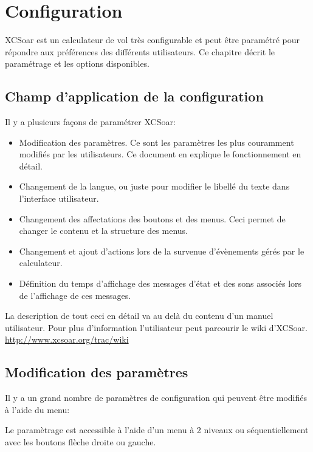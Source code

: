 \chapter{Configuration}\label{cha:configuration}
XCSoar est un calculateur de vol très configurable et peut être paramétré pour répondre aux préférences des différents utilisateurs. Ce chapitre décrit le paramétrage et les options disponibles.

\section{Champ d'application de la configuration}
Il y a plusieurs façons de paramétrer XCSoar:
\begin{itemize}

\item Modification des paramètres. Ce sont les paramètres les plus couramment modifiés par les utilisateurs. Ce document en explique le fonctionnement en détail.
\item Changement de la langue, ou juste pour modifier le libellé du texte dans l'interface utilisateur.
\item Changement des affectations des boutons et des menus. Ceci permet de changer le contenu et la structure des menus.
\item Changement et ajout d'actions lors de la survenue d'évènements gérés par le calculateur.
\item Définition du temps d'affichage des messages d'état et des sons associés lors de l'affichage de ces messages.
\end{itemize}
La description de tout ceci en détail va au delà du contenu d'un manuel utilisateur. Pour plus d'information l'utilisateur peut parcourir le wiki d'XCSoar. \url{http://www.xcsoar.org/trac/wiki}

\section{Modification des paramètres}

Il y a un grand nombre de paramètres de configuration qui peuvent être modifiés à l'aide du menu:
\begin{quote}
\blink{}\blink{}\blink{}
\end{quote}
Le paramètrage est accessible à l'aide d'un menu à 2 niveaux ou séquentiellement avec les boutons flèche droite ou gauche.

